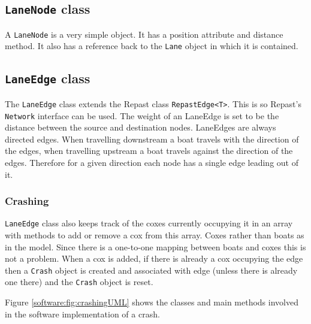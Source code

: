 

\subsection{\texttt{LaneNode} class}
A \texttt{LaneNode} is a very simple object. It has a position attribute and
distance method. It also has a reference back to the \texttt{Lane} object in
which it is contained.

\subsection{\texttt{LaneEdge} class}
The \texttt{LaneEdge} class extends the Repast class \texttt{RepastEdge<T>}. This is so Repast's \texttt{Network} interface can be used. The weight of an LaneEdge is
set to be the distance between the source and destination
nodes. LaneEdges are always directed edges. When travelling downstream
a boat travels with the direction of the edges, when travelling
upstream a boat travels against the direction of the edges. Therefore
for a given direction each node has a single edge leading out of it.

\subsubsection{Crashing}

\texttt{LaneEdge} class also keeps track of the coxes currently occupying it
in an array with methods to add or remove a cox from this array. Coxes rather than boats as in the model. Since there is a one-to-one
mapping between boats and coxes this is not a problem. When a
cox is added, if there is already a cox occupying the edge then a
\texttt{Crash} object is created and associated with edge (unless there is
already one there) and the \texttt{Crash} object is reset.

Figure \ref{software:fig:crashingUML} shows the classes and main methods involved in the software implementation of a crash.

